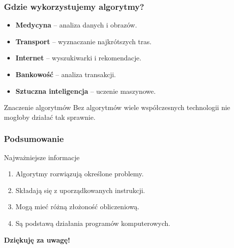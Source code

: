 \documentclass[ aspectratio=169 ]{beamer}
\begin{document}
\begin{frame}
    \frametitle{Gdzie wykorzystujemy algorytmy?}

    \begin{itemize}
        \item \textbf{Medycyna} -- analiza danych i obrazów.
        \item \textbf{Transport} -- wyznaczanie najkrótszych tras.
        \item \textbf{Internet} -- wyszukiwarki i rekomendacje.
        \item \textbf{Bankowość} -- analiza transakcji.
        \item \textbf{Sztuczna inteligencja} -- uczenie maszynowe.
    \end{itemize}

    \begin{alertblock}{Znaczenie algorytmów}
        Bez algorytmów wiele współczesnych technologii
        nie mogłoby działać tak sprawnie.
    \end{alertblock}
\end{frame}

\begin{frame}
    \frametitle{Podsumowanie}

    \begin{block}{Najważniejsze informacje}
        \begin{enumerate}
            \item Algorytmy rozwiązują określone problemy.
            \item Składają się z uporządkowanych instrukcji.
            \item Mogą mieć różną złożoność obliczeniową.
            \item Są podstawą działania programów komputerowych.
        \end{enumerate}
    \end{block}

    \begin{center}
        \Large \textbf{Dziękuję za uwagę!}
    \end{center}

\end{frame}
\end{document}
